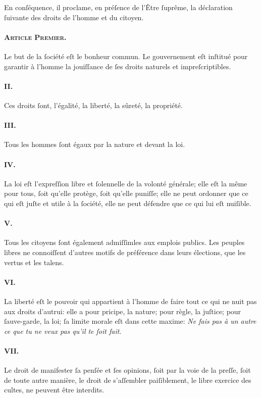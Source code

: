 \documentclass[10pt]{article}
\begin{document}
En conſéquence, il proclame, en préſence de l'Être ſuprême, la déclaration ſuivante des droits de l'homme et du citoyen.
\paragraph*{\textsc{Article Premier.\\}}
Le but de la ſociété eſt le bonheur commun.
Le gouvernement eſt inſtitué pour garantir à l'homme la jouiſſance de ſes droits naturels et impreſcriptibles.
\paragraph*{II.} Ces droits ſont, l'égalité, la liberté, la sûreté, la propriété.
\paragraph*{III.}Tous les hommes ſont égaux par la nature et devant la loi.
\paragraph*{IV.}La loi eſt l'expreſſion libre et ſolennelle de la volonté générale; elle eſt la même pour tous, ſoit qu'elle protège, ſoit qu'elle puniſſe; elle ne peut ordonner que ce qui eſt juſte et utile à la ſociété, elle ne peut défendre que ce qui lui eſt nuiſible.
\paragraph*{V.}Tous les citoyens ſont également admiſſimles aux emplois publics. Les peuples libres ne connoiſſent d'autres motifs de préférence dans leurs élections, que les vertus et les talens.
\paragraph*{VI.}La liberté eſt le pouvoir qui appartient à l'homme de faire tout ce qui ne nuit pas aux droits d'autrui: elle a pour pricipe, la nature; pour règle, la juſtice; pour ſauve-garde, la loi; ſa limite morale eſt dans cette maxime: \emph{Ne fais pas à un autre ce que tu ne veux pas qu'il te ſoit fait}.
\paragraph*{VII.}Le droit de manifester ſa penſée et ſes opinions, ſoit par la voie de la preſſe, ſoit de toute autre manière, le droit de s'aſſembler paiſiblement, le libre exercice des  cultes, ne peuvent être interdits.
\end{document}
